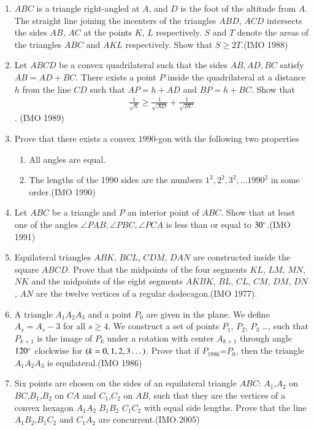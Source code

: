 \begin{enumerate}[label=\thesubsection.\arabic*,ref=\thesubsection.\theenumi]
\item $ABC$ is a triangle right-angled at $A$, and $D$ is the foot of the altitude from $A$. The straight line joining the incenters of the triangles $ABD$, $ACD$ intersects the sides $AB$, $AC$ at the points $K$, $L$ respectively. $S$ and $T$ denote the areas of the triangles $ABC$ and $AKL$ respectively. Show that $S\geq 2T$.\hfill(IMO  1988)
	\item Let $ABCD$ be a convex quadrilateral such that the sides ${AB, AD, BC}$ satisfy $AB= AD + BC$. There exists a point $P$ inside the quadrilateral at a distance $h$ from the line $CD$ such that $AP= h+ AD$ and $BP= h + BC$. Show that \begin{align*}
	\frac{1}{\sqrt{h}}\geq\frac{1}{\sqrt{AD}}+\frac{1}{\sqrt{BC}}\end{align*}. \hfill(IMO  1989)
\item Prove that there exists a convex $1990$-gon with the following     two properties
\begin{enumerate}
\item All angles are equal.
\item The lengths of the 1990 sides are the numbers $1^2, 2^2, 3^2,\dots 1990^2$ in some order.\hfill(IMO  1990)
\end{enumerate}
%
\item Let $ABC$ be a triangle and $P$ an interior point of $ABC$.     Show that at least one of the angles $\angle{PAB}, \angle{PBC}, \angle{PCA}$ is less than or equal to $30\degree$.\hfill(IMO  1991)
%
\item Equilateral triangles $ABK$, $BCL$, $CDM$, $DAN$ are constructed inside the square $ABCD$. Prove that the midpoints of the four segments $KL$, $LM$, $MN$, $NK$ and the midpoints of the eight segments $AKBK$, $BL$, $CL$, $CM$, $DM$, $DN$, $AN$ are the twelve vertices of a regular dodecagon.\hfill(IMO  1977).
\item A triangle $A_1A_2A_3$ and a point $P_0 $ are given in the plane. We define $A_s
    =A_s-3$ for all $s\geq4$. We construct a set of points $P_1$, $P_2$, $P_3$ \dots, such that $P_{k+1}$ is the image of $P_k$ under a rotation with center $A_{k+1}$ through angle $120\degree$ clockwise for $\left(k=0,1,2,3\dots\right)$. Prove that if $P_{1986}$=$P_0$, then the triangle $A_1A_2A_3$ is equilateral.\hfill(IMO  1986)
%
	\item Six points are chosen on the sides of an equilateral triangle $ABC$:
     $A_1$,$A_2$ on $BC$,$B_1$,$B_2$ on $CA$ and $C_1$,$C_2$ on $AB$, such that they are the vertices of a convex hexagon $A_1A_2$ $B_1B_2$ $C_1C_2$ with equal side lengths. Prove that the line $A_1B_2$,$B_1C_2$ and $C_1A_2$ are concurrent.\hfill(IMO  2005)

\end{enumerate}
